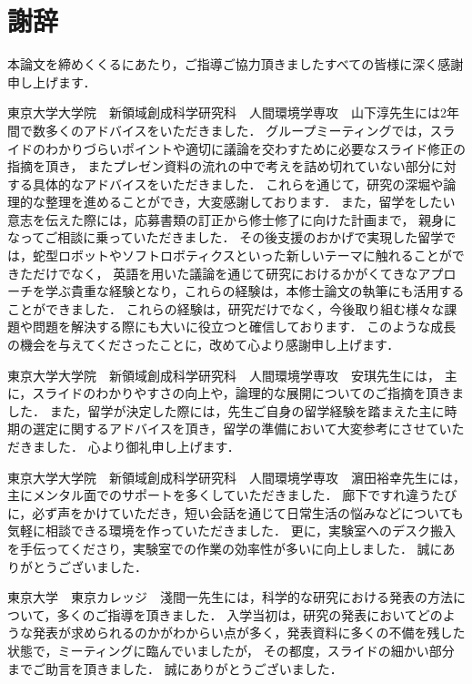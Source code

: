 \documentclass[../main]{subfiles}
\begin{document}
\chapter*{謝辞}
\label{thankyou}

\lhead[謝辞]{}
\thispagestyle{empty}

\newpage


本論文を締めくくるにあたり，ご指導ご協力頂きましたすべての皆様に深く感謝申し上げます．

東京大学大学院　新領域創成科学研究科　人間環境学専攻　山下淳先生には2年間で数多くのアドバイスをいただきました．
グループミーティングでは，スライドのわかりづらいポイントや適切に議論を交わすために必要なスライド修正の指摘を頂き，
またプレゼン資料の流れの中で考えを詰め切れていない部分に対する具体的なアドバイスをいただきました．
これらを通じて，研究の深堀や論理的な整理を進めることができ，大変感謝しております．
また，留学をしたい意志を伝えた際には，応募書類の訂正から修士修了に向けた計画まで，
親身になってご相談に乗っていただきました．
その後支援のおかげで実現した留学では，蛇型ロボットやソフトロボティクスといった新しいテーマに触れることができただけでなく，
英語を用いた議論を通じて研究におけるかがくてきなアプローチを学ぶ貴重な経験となり，これらの経験は，本修士論文の執筆にも活用することができました．
これらの経験は，研究だけでなく，今後取り組む様々な課題や問題を解決する際にも大いに役立つと確信しております．
このような成長の機会を与えてくださったことに，改めて心より感謝申し上げます．


東京大学大学院　新領域創成科学研究科　人間環境学専攻　安琪先生には，
主に，スライドのわかりやすさの向上や，論理的な展開についてのご指摘を頂きました．
また，留学が決定した際には，先生ご自身の留学経験を踏まえた主に時期の選定に関するアドバイスを頂き，留学の準備において大変参考にさせていただきました．
心より御礼申し上げます．

東京大学大学院　新領域創成科学研究科　人間環境学専攻　濵田裕幸先生には，主にメンタル面でのサポートを多くしていただきました．
廊下ですれ違うたびに，必ず声をかけていただき，短い会話を通じて日常生活の悩みなどについても気軽に相談できる環境を作っていただきました．
更に，実験室へのデスク搬入を手伝ってくださり，実験室での作業の効率性が多いに向上しました．
誠にありがとうございました．

東京大学　東京カレッジ　淺間一先生には，科学的な研究における発表の方法について，多くのご指導を頂きました．
入学当初は，研究の発表においてどのような発表が求められるのかがわからい点が多く，発表資料に多くの不備を残した状態で，ミーティングに臨んでいましたが，
その都度，スライドの細かい部分までご助言を頂きました．
誠にありがとうございました．
\end{document}

